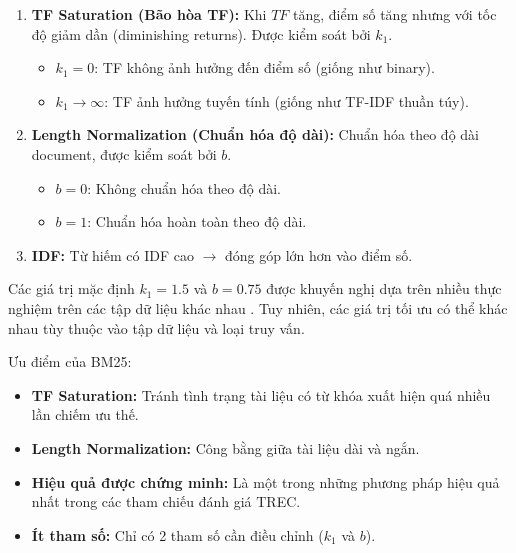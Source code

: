 \documentclass[../BTL.tex]{subfiles}
\begin{document}
\begin{enumerate}
    \item \textbf{TF Saturation (Bão hòa TF):} Khi $TF$ tăng, điểm số tăng nhưng với tốc độ giảm dần (diminishing returns). Được kiểm soát bởi $k_1$.
    \begin{itemize}
        \item $k_1 = 0$: TF không ảnh hưởng đến điểm số (giống như binary).
        
        \item $k_1 \to \infty$: TF ảnh hưởng tuyến tính (giống như TF-IDF thuần túy).
    \end{itemize}
    
    \item \textbf{Length Normalization (Chuẩn hóa độ dài):} Chuẩn hóa theo độ dài document, được kiểm soát bởi $b$.
    \begin{itemize}
        \item $b = 0$: Không chuẩn hóa theo độ dài.
        
        \item $b = 1$: Chuẩn hóa hoàn toàn theo độ dài.
    \end{itemize}
    
    \item \textbf{IDF:} Từ hiếm có IDF cao $\rightarrow$ đóng góp lớn hơn vào điểm số.
\end{enumerate}

Các giá trị mặc định $k_1 = 1.5$ và $b = 0.75$ được khuyến nghị dựa trên nhiều thực nghiệm trên các tập dữ liệu khác nhau \cite{BM25}. Tuy nhiên, các giá trị tối ưu có thể khác nhau tùy thuộc vào tập dữ liệu và loại truy vấn.

Ưu điểm của BM25:
\begin{itemize}
    \item \textbf{TF Saturation:} Tránh tình trạng tài liệu có từ khóa xuất hiện quá nhiều lần chiếm ưu thế.
    
    \item \textbf{Length Normalization:} Công bằng giữa tài liệu dài và ngắn.
    
    \item \textbf{Hiệu quả được chứng minh:} Là một trong những phương pháp hiệu quả nhất trong các tham chiếu đánh giá TREC.
    
    \item \textbf{Ít tham số:} Chỉ có 2 tham số cần điều chỉnh ($k_1$ và $b$).
\end{itemize}
\end{document}
